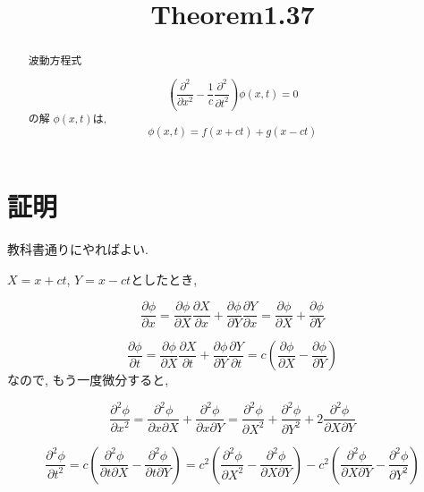 \documentclass{jsarticle} \usepackage[dvipdfmx]{graphicx} \usepackage[dvipdfmx]{hyperref}
\title{Theorem1.37}
\begin{document}
\maketitle

\begin{abstract}
  波動方程式
  
  \begin{equation}
    \left( \frac{\partial^2}{\partial x^2} - \frac{1}{c}\frac{\partial^2}{\partial t^2} \right) \phi(x, t) = 0
  \end{equation}
  の解 $\phi(x, t)$は, 
  \begin{equation}
    \phi(x, t) = f(x + ct) + g(x - ct)
  \end{equation}
\end{abstract}

\section{証明}
教科書通りにやればよい. 

$X = x + ct$, $Y = x - ct$としたとき, 

\begin{equation}
  \frac{\partial \phi}{\partial x}
    = \frac{\partial \phi}{\partial X}\frac{\partial X}{\partial x}
    + \frac{\partial \phi}{\partial Y}\frac{\partial Y}{\partial x}
    = \frac{\partial \phi}{\partial X} + \frac{\partial \phi}{\partial Y}
\end{equation}

\begin{equation}
  \frac{\partial \phi}{\partial t}
    = \frac{\partial \phi}{\partial X}\frac{\partial X}{\partial t}
    + \frac{\partial \phi}{\partial Y}\frac{\partial Y}{\partial t}
    = c \left( \frac{\partial \phi}{\partial X} - \frac{\partial \phi}{\partial Y} \right)
\end{equation}
なので, もう一度微分すると, 

\begin{equation}
  \frac{\partial^2 \phi}{\partial x^2} = \frac{\partial^2 \phi}{\partial x \partial X} + \frac{\partial^2 \phi}{\partial x \partial Y}
  = \frac{\partial^2 \phi}{\partial X^2} + \frac{\partial^2 \phi}{\partial Y^2} + 2\frac{\partial^2 \phi}{\partial X \partial Y}
\end{equation}

\begin{equation}
  \frac{\partial^2 \phi}{\partial t^2} = c \left( \frac{\partial^2 \phi}{\partial t \partial X} - \frac{\partial^2 \phi}{\partial t \partial Y} \right)
  = c^2 \left( \frac{\partial^2 \phi}{\partial X^2} - \frac{\partial^2 \phi}{\partial X \partial Y} \right) - c^2 \left( \frac{\partial^2 \phi}{\partial X \partial Y} - \frac{\partial^2 \phi}{\partial Y^2} \right)
\end{equation}
\end{document}
